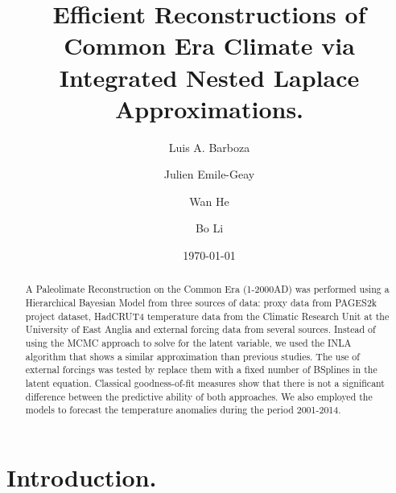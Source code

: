 \documentclass[11pt]{amsart}
\theoremstyle{plain}
\theoremstyle{definition}
\theoremstyle{remark}
\begin{document}
\title[Paleoclimate Reconstruction using INLA.]{Efficient Reconstructions of Common Era Climate via Integrated Nested Laplace Approximations.}

\author{Luis A. Barboza}
\address{Centro de Investigacion en Matematica Pura y Aplicada (CIMPA)-Escuela
  de Matematica, Universidad de Costa Rica\\
San Jos\'e, Costa Rica}


\author{Julien Emile-Geay}
\address{Department of Earth Sciences \\
  University of Southern California \\
  Los Angeles, California, USA.
}

\author{Wan He}

\author{Bo Li}
\address{Department of Statistics \\
  University of Illinois at Urbana-Champaign \\
  Champaign, Illinois, USA.
}



\date{\today}
\subjclass[2010]{}
\maketitle

\begin{abstract}
A Paleolimate Reconstruction on the Common Era (1-2000AD) was performed using a
Hierarchical Bayesian Model from three sources of data: proxy data from PAGES2k
project dataset, HadCRUT4 temperature data from the Climatic Research Unit
at the University of East Anglia and external forcing data from several sources.
Instead of using the MCMC approach to solve for the latent variable, we used the
INLA algorithm that shows a similar approximation than previous studies. The use
of external forcings was tested by replace them with a fixed number of
BSplines in the latent equation. Classical goodness-of-fit measures show that there is not a significant
difference between the predictive ability of both approaches. We also employed
the models to forecast the temperature anomalies during the period 2001-2014.
\end{abstract}

\section{Introduction.}
\label{sec:intro}
\end{document}
